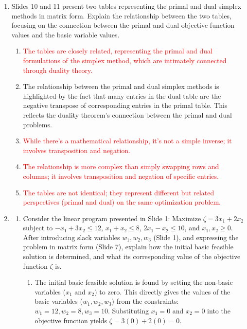 \documentclass{article}%
\newcommand{\incorrect}[1]{\textcolor{red}{#1}}
\begin{document}
\begin{enumerate}
\vspace{1em}%
\item Slides 10 and 11 present two tables representing the primal and dual simplex methods in matrix form.  Explain the relationship between the two tables, focusing on the connection between the primal and dual objective function values and the basic variable values.%
\begin{enumerate}%
\item \incorrect{The tables are closely related, representing the primal and dual formulations of the simplex method, which are intimately connected through duality theory.}%
\item The relationship between the primal and dual simplex methods is highlighted by the fact that many entries in the dual table are the negative transpose of corresponding entries in the primal table. This reflects the duality theorem's connection between the primal and dual problems.%
\item \incorrect{While there's a mathematical relationship, it's not a simple inverse; it involves transposition and negation.}%
\item \incorrect{The relationship is more complex than simply swapping rows and columns; it involves transposition and negation of specific entries.}%
\item \incorrect{The tables are not identical; they represent different but related perspectives (primal and dual) on the same optimization problem.}%
\end{enumerate}%
\vspace{1em}%
\item%
\begin{enumerate}%
\item Consider the linear program presented in Slide 1: Maximize $ \zeta = 3x_1 + 2x_2 $ subject to $ -x_1 + 3x_2 \le 12 $, $ x_1 + x_2 \le 8 $, $ 2x_1 - x_2 \le 10 $, and $ x_1, x_2 \ge 0 $. After introducing slack variables $w_1, w_2, w_3$ (Slide 1), and expressing the problem in matrix form (Slide 7), explain how the initial basic feasible solution is determined, and what its corresponding value of the objective function $\zeta$ is.%
\begin{enumerate}%
\item The initial basic feasible solution is found by setting the non-basic variables ($x_1$ and $x_2$) to zero.  This directly gives the values of the basic variables ($w_1, w_2, w_3$) from the constraints: $w_1 = 12, w_2 = 8, w_3 = 10$. Substituting $x_1 = 0$ and $x_2 = 0$ into the objective function yields $\zeta = 3(0) + 2(0) = 0$.%

\end{enumerate}
\end{enumerate}
\end{enumerate}
\end{document}
